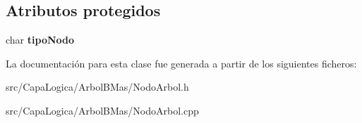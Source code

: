 \subsection*{\-Atributos protegidos}
\begin{DoxyCompactItemize}
\item 
\hypertarget{class_nodo_arbol_a75a5416147c00d34ae17b3982996b1e1}{char {\bfseries tipo\-Nodo}}\label{class_nodo_arbol_a75a5416147c00d34ae17b3982996b1e1}

\end{DoxyCompactItemize}


\-La documentación para esta clase fue generada a partir de los siguientes ficheros\-:\begin{DoxyCompactItemize}
\item 
src/\-Capa\-Logica/\-Arbol\-B\-Mas/\-Nodo\-Arbol.\-h\item 
src/\-Capa\-Logica/\-Arbol\-B\-Mas/\-Nodo\-Arbol.\-cpp\end{DoxyCompactItemize}
